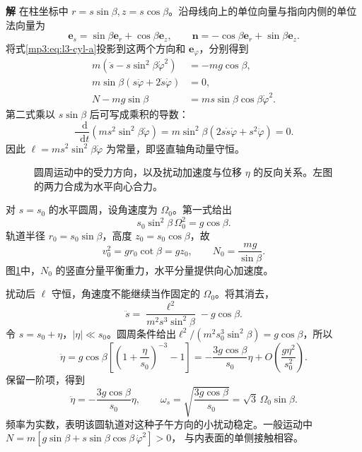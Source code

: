 \documentclass[11pt,openany,fontset=fandol]{ctexbook}
\theoremstyle{definition}\newtheorem{example}{例}[chapter]\newtheorem{exercise}{习题}[chapter]
\newcommand{\SolutionStart}{\par\medskip\ifdim\pagetotal>0pt\ifdim\dimexpr\pagegoal-\pagetotal\relax<3\baselineskip\newpage\fi\fi\noindent\textbf{解}\quad\ignorespaces}
\newenvironment{solution}{\SolutionStart}{\par\medskip}
\newcommand{\dd}{\mathop{}\!\mathrm d}\newcommand{\ee}{\mathrm e}\newcommand{\vct}[1]{\bm{#1}}
\begin{document}
\begin{solution}
在柱坐标中 $r=s\sin\beta,z=s\cos\beta$。沿母线向上的单位向量与指向内侧的单位法向量为
\[
\vct e_s=\sin\beta\vct e_r+\cos\beta\vct e_z,\qquad
\vct n=-\cos\beta\vct e_r+\sin\beta\vct e_z.
\]
将式\eqref{mp3:eq:l3-cyl-a}投影到这两个方向和 $\vct e_\varphi$，分别得到
\begin{align*}
m(\ddot s-s\sin^2\beta\dot\varphi^2)&=-mg\cos\beta,\\
m\sin\beta(s\ddot\varphi+2\dot s\dot\varphi)&=0,\\
N-mg\sin\beta&=ms\sin\beta\cos\beta\dot\varphi^2.
\end{align*}
第二式乘以 $s\sin\beta$ 后可写成乘积的导数：
\[
\frac{\dd}{\dd t}(ms^2\sin^2\beta\dot\varphi)
=m\sin^2\beta(2s\dot s\dot\varphi+s^2\ddot\varphi)=0.
\]
因此 $\ell=ms^2\sin^2\beta\dot\varphi$ 为常量，即竖直轴角动量守恒。

\begin{figure}[H]\centering
{}
\caption{圆周运动中的受力方向，以及扰动加速度与位移 $\eta$ 的反向关系。左图的两力合成为水平向心合力。}\label{mp3:fig:l3-e8-s}
\end{figure}


对 $s=s_0$ 的水平圆周，设角速度为 $\Omega_0$。第一式给出
\[
s_0\sin^2\beta\,\Omega_0^2=g\cos\beta.
\]
轨道半径 $r_0=s_0\sin\beta$，高度 $z_0=s_0\cos\beta$，故
\[
v_0^2=g r_0\cot\beta=g z_0,\qquad N_0=\frac{mg}{\sin\beta}.
\]
图\ref{mp3:fig:l3-e8-s}中，$N_0$ 的竖直分量平衡重力，水平分量提供向心加速度。

扰动后 $\ell$ 守恒，角速度不能继续当作固定的 $\Omega_0$。将其消去，
\[
\ddot s=\frac{\ell^2}{m^2s^3\sin^2\beta}-g\cos\beta.
\]
令 $s=s_0+\eta$，$|\eta|\ll s_0$。圆周条件给出$\ell^2/(m^2s_0^3\sin^2\beta)=g\cos\beta$，所以
\[
\ddot\eta=g\cos\beta\left[\left(1+\frac\eta{s_0}\right)^{-3}-1\right]
=-\frac{3g\cos\beta}{s_0}\eta
+O\!\left(\frac{g\eta^2}{s_0^2}\right).
\]
保留一阶项，得到
\[
\ddot\eta=-\frac{3g\cos\beta}{s_0}\eta,\qquad
\omega_s=\sqrt{\frac{3g\cos\beta}{s_0}}
=\sqrt3\,\Omega_0\sin\beta.
\]
频率为实数，表明该圆轨道对这种子午方向的小扰动稳定。一般运动中
$N=m[g\sin\beta+s\sin\beta\cos\beta\,\dot\varphi^2]>0$，
与内表面的单侧接触相容。

\end{solution}
\end{document}
